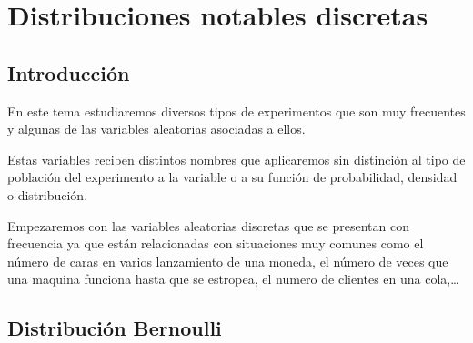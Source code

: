 \documentclass[
  letterpaper,
  DIV=11,
  numbers=noendperiod]{scrreprt}
\begin{document}
\chapter{Distribuciones notables
discretas}\label{distribuciones-notables-discretas}

\section{Introducción}\label{introducciuxf3n-1}

En este tema estudiaremos diversos tipos de experimentos que son muy
frecuentes y algunas de las variables aleatorias asociadas a ellos.

Estas variables reciben distintos nombres que aplicaremos sin distinción
al tipo de población del experimento a la variable o a su función de
probabilidad, densidad o distribución.

Empezaremos con las variables aleatorias discretas que se presentan con
frecuencia ya que están relacionadas con situaciones muy comunes como el
número de caras en varios lanzamiento de una moneda, el número de veces
que una maquina funciona hasta que se estropea, el numero de clientes en
una cola,\ldots{}

\section{Distribución Bernoulli}\label{distribuciuxf3n-bernoulli}
\end{document}

